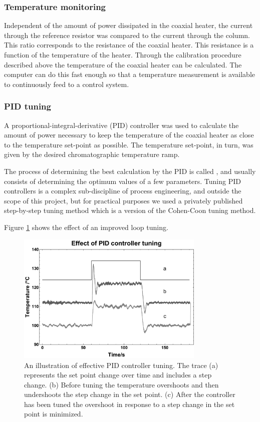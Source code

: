 \subsubsection{Temperature monitoring}

Independent of the amount of power dissipated in the coaxial heater, the current
through the reference resistor was compared to the current through the column.
This ratio corresponds to the resistance of the coaxial heater. This resistance
is a function of the temperature of the heater. Through the calibration
procedure described above the temperature of the coaxial heater can be
calculated. The computer can do this fast enough so that a temperature
measurement is available to continuously feed to a control system.

\subsubsection{PID tuning}

A proportional-integral-derivative (PID) controller was used to calculate the
amount of power necessary to keep the temperature of the coaxial heater as close
to the temperature set-point as possible. The temperature set-point, in turn,
was given by the desired chromatographic temperature ramp.

The process of determining the best calculation by the PID is called
, and usually consists of determining the optimum values of a few
parameters. Tuning PID controllers is a complex sub-discipline of process
engineering, and outside the scope of this project, but for practical purposes
we used a privately published step-by-step tuning method \autocite{Peacock2008}
which is a version of the Cohen-Coon tuning method.

Figure \ref{fig:LoopTuning} shows the effect of an improved loop tuning. 

\begin{figure}
	\centering
	\includegraphics[width=0.8\textwidth]{Figures/LoopTuningGraph.pdf}
	\decoRule	
	\caption[Effect of controller tuning]{An illustration of effective PID
	controller tuning. The trace (a) represents the set point change over time and
	includes a step change. (b) Before tuning the temperature overshoots and then
	undershoots the step change in the set point. (c) After the controller has been
	tuned the overshoot in response to a step change in the set point is minimized. }
	\label{fig:LoopTuning} 
\end{figure}

